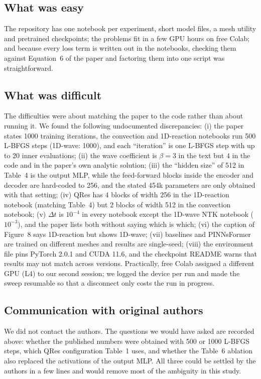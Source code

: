 \documentclass[10pt]{article} %
\begin{document}
\subsection{What was easy}
The repository has one notebook per experiment, short model files, a mesh utility and pretrained checkpoints; the problems fit in a few GPU hours on free Colab; and because every loss term is written out in the notebooks, checking them against Equation~6 of the paper and factoring them into one script was straightforward.

\subsection{What was difficult}
The difficulties were about matching the paper to the code rather than about running it. We found the following undocumented discrepancies: (i) the paper states 1000 training iterations, the convection and 1D-reaction notebooks run 500 L-BFGS steps (1D-wave: 1000), and each ``iteration'' is one L-BFGS step with up to 20 inner evaluations; (ii) the wave coefficient is $\beta=3$ in the text but $4$ in the code and in the paper's own analytic solution; (iii) the ``hidden size'' of 512 in Table~4 is the output MLP, while the feed-forward blocks inside the encoder and decoder are hard-coded to 256, and the stated 454k parameters are only obtained with that setting; (iv) QRes has 4 blocks of width 256 in the 1D-reaction notebook (matching Table~4) but 2 blocks of width 512 in the convection notebook; (v) $\Delta t$ is $10^{-4}$ in every notebook except the 1D-wave NTK notebook ($10^{-3}$), and the paper lists both without saying which is which; (vi) the caption of Figure~8 says 1D-reaction but shows 1D-wave; (vii) baselines and PINNsFormer are trained on different meshes and results are single-seed; (viii) the environment file pins PyTorch 2.0.1 and CUDA 11.6, and the checkpoint README warns that results may not match across versions. Practically, free Colab assigned a different GPU (L4) to our second session; we logged the device per run and made the sweep resumable so that a disconnect only costs the run in progress.

\subsection{Communication with original authors}
We did not contact the authors. The questions we would have asked are recorded above: whether the published numbers were obtained with 500 or 1000 L-BFGS steps, which QRes configuration Table~1 uses, and whether the Table~6 ablation also replaced the activations of the output MLP. All three could be settled by the authors in a few lines and would remove most of the ambiguity in this study.
\end{document}
